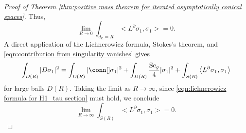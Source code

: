 \documentclass[12pt, reqno]{amsart}
\theoremstyle{plain} %
\theoremstyle{definition}
\theoremstyle{remark}
\numberwithin{equation}{section}
\newcommand{\pnorm}[1]{| #1 |}
\newcommand{\cat}[1]{\mathcal{#1}}
\newcommand{\Sc}{\mathrm{Sc}}
\begin{document}
\begin{proof}[Proof of Theorem \ref{thm:positive mass theorem for iterated asymptotically conical spaces}]
    Thus,
    \begin{equation}\label{eqn:contribution from singularity vanishes}
        \lim_{R \to 0} \int_{d_\cat{C}=R} \big< L^\partial \sigma_1, \sigma_1 \big> = 0.
    \end{equation}
    A direct application of the Lichnerowicz formula, Stokes's theorem, and \eqref{eqn:contribution from singularity vanishes} gives
    \begin{equation}
        \label{eqn:direct lichnerowicz formula}\int_{D(R)} \pnorm{D\sigma_1}^2 = \int_{D(R)} \pnorm{\conn[]\sigma_1}^2 + \int_{D(R)} \frac{\Sc_g}{4} \pnorm{\sigma_1}^2 + \int_{S(R)} \big< L^\partial \sigma_1, \sigma_1 \big>
    \end{equation}
    for large balls \(D(R)\).
    Taking the limit as \(R \to \infty\), since \eqref{eqn:lichnerowicz formula for H1_tau section} must hold, we conclude
    \begin{equation*}
        \lim_{R \to \infty} \int_{S(R)} \big< L^\partial \sigma_1, \sigma_1 \big> = 0.
    \end{equation*}


\end{proof}
\end{document}
